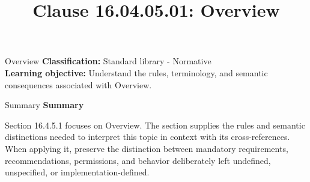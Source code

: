 \documentclass[10pt,letterpaper]{article}
\title{Clause 16.04.05.01: Overview}
\author{}
\date{}
\begin{document}
\maketitle
\begin{CornellOverviewBox}{Overview}
\textbf{Classification:} Standard library - Normative\\[2pt]
\textbf{Learning objective:} Understand the rules, terminology, and semantic consequences associated with Overview.
\end{CornellOverviewBox}\begin{CornellSummaryBox}{Summary}
{\sffamily\bfseries\color{Accent} Summary}\par\vspace{3pt}Section 16.4.5.1 focuses on Overview. The section supplies the rules and semantic distinctions needed to interpret this topic in context with its cross-references. When applying it, preserve the distinction between mandatory requirements, recommendations, permissions, and behavior deliberately left undefined, unspecified, or implementation-defined.
\end{CornellSummaryBox}
\end{document}
